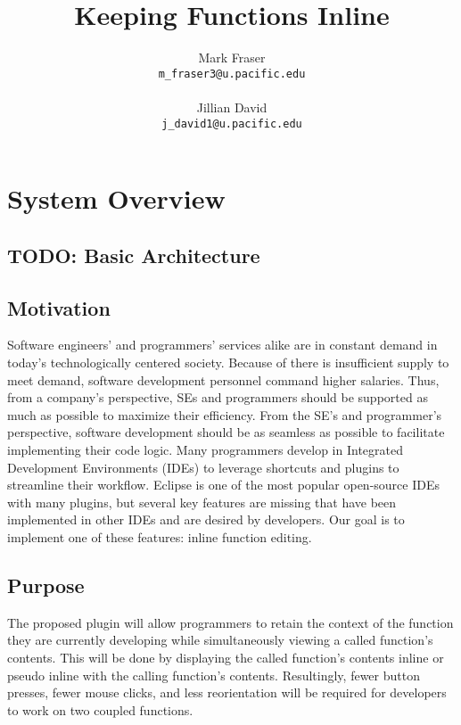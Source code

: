 \documentclass[]{report}
\title{Keeping Functions Inline}
\author{Mark Fraser\\\texttt{m\_fraser3@u.pacific.edu}\\ \\Jillian David\\ \texttt{j\_david1@u.pacific.edu}}
\begin{document}
\maketitle

\newpage
\tableofcontents
\newpage

\chapter{System Overview}

\section{TODO: Basic Architecture}

\section{Motivation}

Software engineers' and programmers' services alike are in constant demand in today's technologically centered society.  Because of there is insufficient supply to meet demand, software development personnel command higher salaries.  Thus, from a company's perspective, SEs and programmers should be supported as much as possible to maximize their efficiency.  From the SE's and programmer's perspective, software development should be as seamless as possible to facilitate implementing their code logic.  Many programmers develop in Integrated Development Environments (IDEs) to leverage shortcuts and plugins to streamline their workflow.  Eclipse is one of the most popular open-source IDEs with many plugins, but several key features are missing that have been implemented in other IDEs and are desired by developers.  Our goal is to implement one of these features:  inline function editing.

\section{Purpose}

The proposed plugin will allow programmers to retain the context of the function they are currently developing while simultaneously viewing a called function's contents.  This will be done by displaying the called function's contents inline or pseudo inline with the calling function's contents.  Resultingly, fewer button presses, fewer mouse clicks, and less reorientation will be required for developers to work on two coupled functions.
\end{document}
